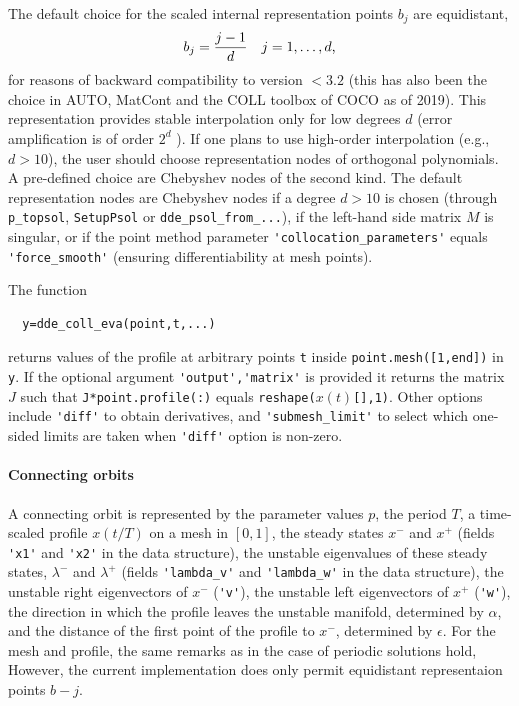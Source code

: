 \documentclass[10pt]{scrartcl}
\newcommand{\blist}[1]{\mbox{\lstinline!#1!}}
\begin{document}
The default choice for the scaled internal representation points $b_j$ are equidistant,
\begin{displaymath}
  b_j=\frac{j-1}{d}\mbox{\quad $j=1,\ldots,d$,}
\end{displaymath}
for reasons of backward compatibility to version $<3.2$ (this has also
been the choice in AUTO, MatCont and the COLL toolbox of \textsc{COCO}
as of 2019). This representation provides stable interpolation only
for low degrees $d$ (error amplification is of order $2^d$
\cite{berrut2004}). If one plans to use high-order interpolation
(e.g., $d>10$), the user should choose representation nodes of
orthogonal polynomials. A pre-defined choice are Chebyshev nodes of
the second kind. The default representation nodes are Chebyshev nodes
if a degree $d>10$ is chosen (through \blist{p_topsol},
\blist{SetupPsol} or \blist{dde_psol_from_...}), if the left-hand side
matrix $M$ is singular, or if the point method parameter
\blist{'collocation_parameters'} equals \blist{'force_smooth'}
(ensuring differentiability at mesh points).

The function
\begin{lstlisting}
  y=dde_coll_eva(point,t,...)
\end{lstlisting}
returns values of the profile at arbitrary points \blist{t} inside
\blist{point.mesh([1,end])} in \blist{y}. If the optional argument
\blist{'output','matrix'} is provided it returns the matrix $J$ such
that \blist{J*point.profile(:)} equals
\blist{reshape(}$x(t)$\blist{[],1)}. Other options include
\blist{'diff'} to obtain derivatives, and \blist{'submesh_limit'} to
select which one-sided limits are taken when \blist{'diff'} option is
non-zero.

\paragraph{Connecting orbits}
A connecting orbit is represented by the parameter values ${p}$, the
period $T$, a time-scaled profile $x(t/T)$ on a mesh in $[0,1]$, the
steady states $x^-$ and $x^+$ (fields \blist{'x1'} and \blist{'x2'} in
the data structure), the unstable eigenvalues of these steady states,
$\lambda^-$ and $\lambda^+$ (fields \blist{'lambda_v'} and
\blist{'lambda_w'} in the data structure), the unstable right
eigenvectors of $x^-$ (\blist{'v'}), the unstable left eigenvectors of
$x^+$ (\blist{'w'}), the direction in which the profile leaves the
unstable manifold, determined by $\alpha$, and the distance of the
first point of the profile to $x^-$, determined by $\epsilon$.  For
the mesh and profile, the same remarks as in the case of periodic
solutions hold, However, the current implementation does only permit
equidistant representaion points $b-j$.
\end{document}
